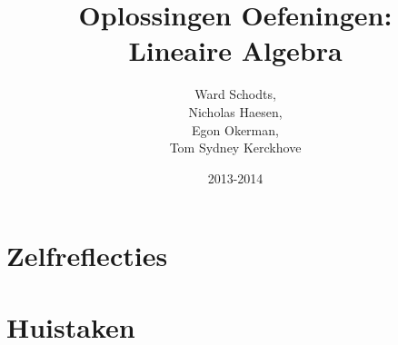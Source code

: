 \documentclass[a4paper,10pt]{article}
\title{Oplossingen Oefeningen:\\Lineaire Algebra}
\author{
Ward Schodts,\\
Nicholas Haesen,\\
Egon Okerman,\\
Tom Sydney Kerckhove}
\date{2013-2014}
\begin{document}
\begin{titlepage}
\maketitle
\end{titlepage}
\tableofcontents
\pagebreak








\part{Zelfreflecties}




\part{Huistaken}


\end{document}
